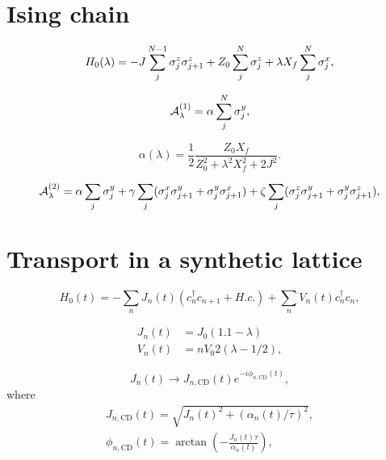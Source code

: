 \section{Ising chain}\label{sec:5.2_Ising_chain}

\begin{equation}\label{eq:ising_chain_hamiltonian}
    H_0(\lambda) = - J \sum_{j}^{N-1} \sigma^z_j \sigma^z_{j+1} + Z_0\sum_j^N \sigma^z_j + \lambda X_f \sum_j^N \sigma^x_j,
\end{equation}

\begin{equation}
    \mathcal{A}_{\lambda}^{(1)} = \alpha \sum_{j}^N\sigma^y_j,
\end{equation}

\begin{equation}
    \alpha(\lambda) = \frac{1}{2} \frac{Z_0 X_f}{Z_0^2 + \lambda^2 X_f^2 + 2J^2}.
\end{equation}

\begin{equation}
    \mathcal{A}_{\lambda}^{(2)} = \alpha \sum_{j} \sigma^y_j + \gamma  \sum_{j} (\sigma^x_j \sigma^y_{j+1} + \sigma^y_j \sigma^x_{j+1}) +  \zeta \sum_{j} (\sigma^z_j \sigma^y_{j+1} + \sigma^y_j \sigma^z_{j+1}) ,
\end{equation}

\section{Transport in a synthetic lattice}

\begin{equation}\label{eq:lattice_hamiltonian}
    H_0(t) = - \sum_n J_n(t)(c_n^{\dag}c_{n+1} + H.c.) + \sum_n V_n(t) c_n^{\dag}c_n,
\end{equation}

\begin{align} \label{eq:J_lattice}
    J_n(t) &= J_0(1.1 - \lambda) \\ \label{eq:V_lattice}
    V_n(t) &= n V_0 2 (\lambda - 1/2),
\end{align}

\begin{equation}\label{eq:tunneling}
    J_n(t) \rightarrow J_{n, \mathrm{CD}}(t) e^{-i\phi_{n, \mathrm{CD}}(t)},
\end{equation}
where
\begin{align}\label{eq:J_cd}
    J_{n, \mathrm{CD}}(t) = \sqrt{J_n(t)^2 + (\alpha_n(t)/\tau)^2}, \\ \label{eq:phi_cd}
    \phi_{n, \mathrm{CD}}(t)  = \arctan\left(-\frac{J_n(t)\tau}{\alpha_n(t)}\right),
\end{align}

